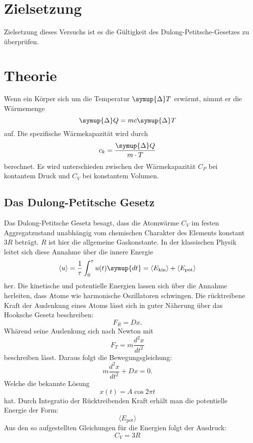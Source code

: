 \section{Zielsetzung}
Zielsetzung dieses Versuchs ist es die Gültigkeit des Dulong-Petitsche-Gesetzes zu überprüfen.
\section{Theorie}
\label{sec:Theorie}
Wenn ein Körper sich um die Temperatur $\symup{\Delta} T$ erwärmt, nimmt er die Wärmemenge
\begin{equation}
\symup{\Delta} Q = m c \symup{\Delta} T
\end{equation}
auf.
Die spezifische Wärmekapazität wird durch
\begin{equation}
c_k = \frac{\symup{\Delta} Q}{m \cdot T}
\end{equation}
berechnet.
Es wird unterschieden zwischen der Wärmekapazität $C_P$ bei kontantem Druck und $C_V$ bei konstantem Volumen.
\subsection{Das Dulong-Petitsche Gesetz}
Das Dulong-Petitsche Gesetz besagt, dass die Atomwärme $C_V$ im festen Aggregatzustand
unabhängig vom chemischen Charakter des Elements konstant $3R$ beträgt.
$R$ ist hier die allgemeine Gaskonstante.
In der klassischen Physik leitet sich diese Annahme über die innere Energie
 \begin{equation}
 \langle u \rangle = \frac{1}{\tau} \int_0^\tau u(t)\symup{dt} = \langle E_\text{kin} \rangle + \langle
E_\text{pot} \rangle
 \end{equation}
her.
Die kinetische und potentielle Energien lassen sich über die Annahme herleiten, dass Atome
wie harmonische Oszillatoren schwingen.
Die rücktreibene Kraft der Auslenkung eines Atoms lässt sich in guter Näherung über das Hooksche Gesetz beschreiben:
\begin{equation}
  F_R= Dx .
\end{equation}
Whärend seine Auslenkung sich nach Newton mit
\begin{equation}
  F_T=   m \frac{d^2 x}{dt^2}
\end{equation}
beschreiben lässt.
Daraus folgt die Bewegungsgleichung:
\begin{equation}
  m \frac{d^2 x}{dt^2}+Dx=0 .
\end{equation}
Welche die bekannte Lösung
\begin{equation}
  x(t)=A \cos{2\pi t}
\end{equation}
hat.
Durch Integratio der Rücktreibenden Kraft erhält man die potentielle Energie der Form:
\begin{equation}
  \langle E_\text{pot} \rangle
\end{equation}
Aus den so aufgestellten Gleichungen für die Energien folgt der Ausdruck:
\begin{equation}
\label{eqn:peitsche}
C_V = 3R
\end{equation}
